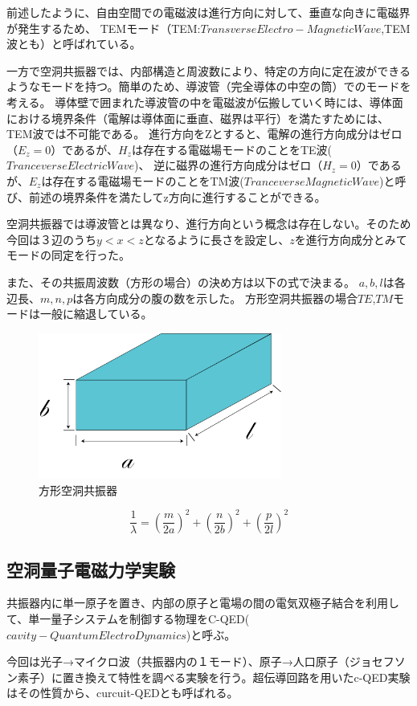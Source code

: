 前述したように、自由空間での電磁波は進行方向に対して、垂直な向きに電磁界が発生するため、
TEMモード（TEM:$Transverse Electro-Magnetic Wave$,TEM波とも）と呼ばれている。

一方で空洞共振器では、内部構造と周波数により、特定の方向に定在波ができるようなモードを持つ。簡単のため、導波管（完全導体の中空の筒）でのモードを考える。
導体壁で囲まれた導波管の中を電磁波が伝搬していく時には、導体面における境界条件（電解は導体面に垂直、磁界は平行）を満たすためには、TEM波では不可能である。
進行方向をZとすると、電解の進行方向成分はゼロ（$E_z = 0$）であるが、$H_z$は存在する電磁場モードのことをTE波($Tranceverse Electric Wave$)、
逆に磁界の進行方向成分はゼロ（$H_z=0$）であるが、$E_z$は存在する電磁場モードのことをTM波($Tranceverse Magnetic Wave$)と呼び、前述の境界条件を満たしてz方向に進行することができる。

空洞共振器では導波管とは異なり、進行方向という概念は存在しない。そのため今回は３辺のうち$y<x<z$となるように長さを設定し、$z$を進行方向成分とみてモードの同定を行った。

また、その共振周波数（方形の場合）の決め方は以下の式で決まる。
$a,b,l$は各辺長、$m,n,p$は各方向成分の腹の数を示した。
方形空洞共振器の場合$TE$,$TM$モードは一般に縮退している。

\vspace{10 mm}

\begin{figure}[h]
  \begin{center}
    \includegraphics[width=8cm]{./image/空洞共振器.png}
    \caption{方形空洞共振器}
    \label{fig:Cavity}
  \end{center}
\end{figure}

\[
 \frac{1}{\lambda} = (\frac{m}{2a})^2 + (\frac{n}{2b})^2 + (\frac{p}{2l})^2
\]

\subsection{空洞量子電磁力学実験}
共振器内に単一原子を置き、内部の原子と電場の間の電気双極子結合を利用して、単一量子システムを制御する物理をC-QED($cavity - Quantum ElectroDynamics$)と呼ぶ。

今回は光子→マイクロ波（共振器内の１モード）、原子→人口原子（ジョセフソン素子）に置き換えて特性を調べる実験を行う。超伝導回路を用いたc-QED実験はその性質から、curcuit-QEDとも呼ばれる。
